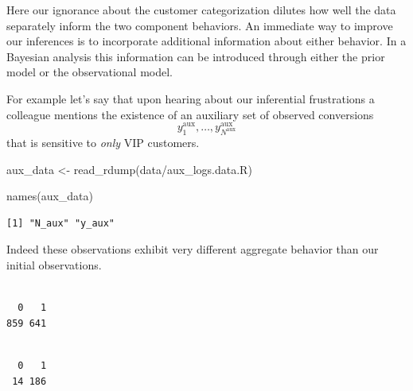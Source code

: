 \documentclass[
  letterpaper,
  DIV=11,
  numbers=noendperiod]{scrartcl}
\newenvironment{Shaded}{\begin{snugshade}}{\end{snugshade}}
\newcommand{\FunctionTok}[1]{\textcolor[rgb]{0.28,0.35,0.67}{#1}}
\newcommand{\NormalTok}[1]{\textcolor[rgb]{0.00,0.23,0.31}{#1}}
\newcommand{\OtherTok}[1]{\textcolor[rgb]{0.00,0.23,0.31}{#1}}
\newcommand{\SpecialCharTok}[1]{\textcolor[rgb]{0.37,0.37,0.37}{#1}}
\newcommand{\StringTok}[1]{\textcolor[rgb]{0.13,0.47,0.30}{#1}}
\begin{document}
Here our ignorance about the customer categorization dilutes how well
the data separately inform the two component behaviors. An immediate way
to improve our inferences is to incorporate additional information about
either behavior. In a Bayesian analysis this information can be
introduced through either the prior model or the observational model.

For example let's say that upon hearing about our inferential
frustrations a colleague mentions the existence of an auxiliary set of
observed conversions \[
y^{\text{aux}}_{1}, \ldots, y^{\text{aux}}_{N^{\text{aux}}}
\] that is sensitive to \emph{only} VIP customers.

\begin{Shaded}
\begin{Highlighting}[]
\NormalTok{aux\_data }\OtherTok{\textless{}{-}} \FunctionTok{read\_rdump}\NormalTok{(}\StringTok{\textquotesingle{}data/aux\_logs.data.R\textquotesingle{}}\NormalTok{)}

\FunctionTok{names}\NormalTok{(aux\_data)}
\end{Highlighting}
\end{Shaded}

\begin{verbatim}
[1] "N_aux" "y_aux"
\end{verbatim}

Indeed these observations exhibit very different aggregate behavior than
our initial observations.

\begin{Shaded}
\end{Shaded}

\begin{verbatim}

  0   1 
859 641 
\end{verbatim}

\begin{Shaded}
\end{Shaded}

\begin{verbatim}

  0   1 
 14 186 
\end{verbatim}
\end{document}
